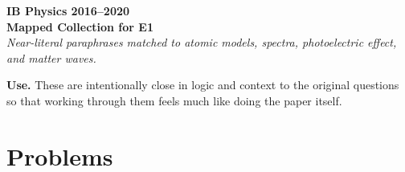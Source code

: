 \documentclass[11pt]{article}
\begin{document}
\begin{center}
{\LARGE \textbf{IB Physics 2016--2020}}\\
{\large \textbf{Mapped Collection for E1}}\\
\vspace{0.3em}
\textit{Near-literal paraphrases matched to atomic models, spectra, photoelectric effect, and matter waves.}
\end{center}

\textbf{Use.} These are intentionally close in logic and context to the original questions so that working through them feels much like doing the paper itself.

\section*{Problems}
\end{document}
